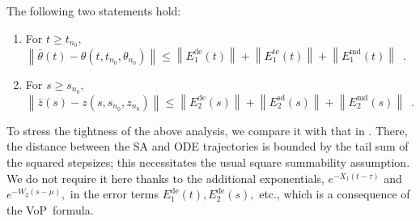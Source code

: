 \documentclass[usenames,dvipsnames,final,12pt]{colt2018} %
\newcommand{\vop}{VoP}
\newcommand{\Xt}{X_1}
\newcommand{\Rti}{R_1^{\textrm{in}}}
\newcommand{\thS}{\theta^*}
\newcommand{\bart}{\bar{\theta}}
\newcommand{\Et}{E_1}
\newcommand{\tSol}[1]{\theta(#1, \tI{n_0}, \theta_{n_0})}
\newcommand{\EtD}{\Et^{\dt}}
\newcommand{\EtM}{\Et^{\md}}
\newcommand{\EtT}{\Et^{\te}}
\newcommand{\Ww}{W_2}
\newcommand{\Rzi}{R_2^{\textrm{in}}}
\newcommand{\barz}{\bar{z}}
\newcommand{\Ez}{E_2}
\newcommand{\EzD}{\Ez^{\dt}}
\newcommand{\EzM}{\Ez^{\md}}
\newcommand{\EzS}{\Ez^{\sd}}
\newcommand{\zSol}[1]{z(#1, \sI{n_0}, z_{n_0})}
\newcommand{\dt}{\text{de}}
\newcommand{\md}{\text{md}}
\newcommand{\sd}{\text{sd}}
\newcommand{\te}{\text{te}}
\newcommand{\df}{\mathrm{d}}
\newcommand{\Gp}{G^\prime}
\newcommand{\tI}[1]{t_{#1}}
\newcommand{\sI}[1]{s_{#1}}
\newcommand{\norm}[1]{\left\lVert#1\right\rVert}
\newcommand{\gal}[1]{#1}
\begin{document}


\begin{lemma}
%
\label{lem:PerBd}
The following two statements hold:
%
\begin{enumerate}
%
\item For $t \geq \tI{n_0},$  $\norm{\bart(t) - \tSol{t}}\leq \norm{\EtD(t)} + \norm{\EtT(t)} + \norm{\EtM(t)} \enspace.$
%
\item For $s \geq \sI{n_0},$ $\norm{\barz(s) - \zSol{s}}\leq \norm{\EzD(s)} + \norm{\EzS(s)} + \norm{\EzM(s)} \enspace.$
\end{enumerate}
%
\end{lemma}

To stress the tightness of the above analysis, we compare it with that in \citep[p. 14]{borkar2008stochastic}. There, the distance between the SA and ODE trajectories is bounded by the tail sum of the squared stepsizes; this necessitates the usual square summability assumption. We do not require it here thanks to the additional exponentials, $e^{-\Xt(t - \tau)}$ and $e^{-\Ww(s - \mu)},$ in the error terms $\EtD(t), \EzD(s),$ etc., which is a consequence of the \vop\ formula.
%

%
%
%
%
%
\end{document}
